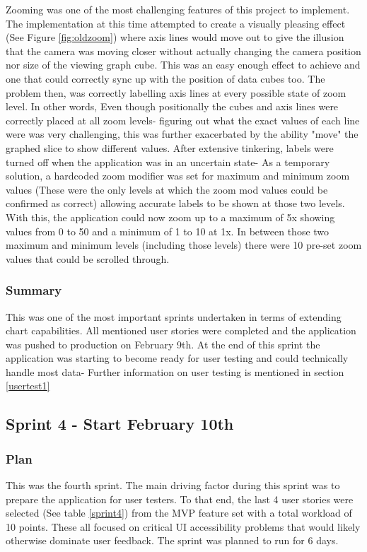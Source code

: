 Zooming was one of the most challenging features of this project to implement. The implementation at this time attempted to create a visually pleasing effect (See Figure \ref{fig:oldzoom}) where axis lines would move out to give the illusion that the camera was moving closer without actually changing the camera position nor size of the viewing graph cube. This was an easy enough effect to achieve and one that could correctly sync up with the position of data cubes too.
The problem then, was correctly labelling axis lines at every possible state of zoom level. In other words, Even though positionally the cubes and axis lines were correctly placed at all zoom levels- figuring out what the exact values of each line were was very challenging, this was further exacerbated by the ability "move" the graphed slice to show different values. After extensive tinkering, labels were turned off when the application was in an uncertain state- As a temporary solution, a hardcoded zoom modifier was set for maximum and minimum zoom values (These were the only levels at which the zoom mod values could be confirmed as correct) allowing accurate labels to be shown at those two levels.
With this, the application could now zoom up to a maximum of 5x showing values from 0 to 50 and a minimum of 1 to 10 at 1x. In between those two maximum and minimum levels (including those levels) there were 10 pre-set zoom values that could be scrolled through.

\subsubsection{Summary}
This was one of the most important sprints undertaken in terms of extending chart capabilities. All mentioned user stories were completed and the application was pushed to production on February 9th. At the end of this sprint the application was starting to become ready for user testing and could technically handle most data- Further information on user testing is mentioned in section \ref{usertest1}

\subsection{Sprint 4 - Start February 10th}
\subsubsection{Plan}
This was the fourth sprint. The main driving factor during this sprint was to prepare the application for user testers. To that end, the last 4 user stories were selected (See table \ref{sprint4}) from the MVP feature set with a total workload of 10 points. These all focused on critical UI accessibility problems that would likely otherwise dominate user feedback. The sprint was planned to run for 6 days.

